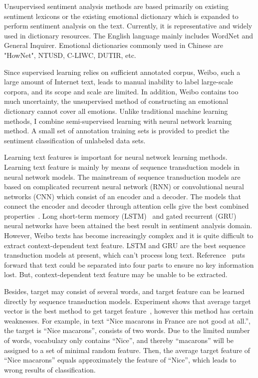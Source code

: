 \documentclass[runningheads, twocolumn]{llncs}
\begin{document}
Unsupervised sentiment analysis methods are based primarily on existing sentiment lexicons or the existing emotional dictionary which is expanded to perform sentiment analysis on the text. Currently, it is representative and widely used in dictionary resources. The English language mainly includes WordNet and General Inquirer. Emotional dictionaries commonly used in Chinese are "HowNet", NTUSD, C-LIWC, DUTIR, etc.

Since supervised learning relies on sufficient annotated corpus, Weibo, such a large amount of Internet text, leads to manual inability to label large-scale corpora, and its scope and scale are limited. In addition, Weibo contains too much uncertainty, the unsupervised method of constructing an emotional dictionary cannot cover all emotions.  Unlike traditional machine learning methods, I combine semi-supervised learning with neural network learning method. A small set of annotation training sets is provided to predict the sentiment classification of unlabeled data sets.

Learning text features is important for neural network learning methods. Learning text feature is mainly by means of sequence transduction models in neural network models. The mainstream of sequence transduction models are based on complicated recurrent neural network (RNN) or convolutional neural networks (CNN) which consist of an encoder and a decoder. The models that connect the encoder and decoder through attention cells give the best combined properties~\cite{DBLP:conf/nips/VaswaniSPUJGKP17}. Long short-term memory (LSTM)~\cite{DBLP:journals/neco/HochreiterS97} and gated recurrent (GRU)~\cite{DBLP:journals/corr/ChungGCB14} neural networks have been attained the best result in sentiment analysis domain. However, Weibo texts has become increasingly complex and it is quite difficult to extract context-dependent text feature. LSTM and GRU are the best sequence transduction models at present, which can’t process long text. Reference~\cite{DBLP:conf/naacl/SongSLZ18} puts forward that text could be separated into four parts to ensure no key information lost. But, context-dependent text feature may be unable to be extracted.

Besides, target may consist of several words, and target feature can be learned directly by sequence transduction models. Experiment shows that average target vector is the best method to get target feature~\cite{DBLP:journals/eswa/DoPMA19}, however this method has certain weaknesses. For example, in text “Nice macarons in France are not good at all.”, the target is “Nice macarons”, consists of two words. Due to the limited number of words, vocabulary only contains “Nice”, and thereby “macarons” will be assigned to a set of minimal random feature. Then, the average target feature of “Nice macarons” equals approximately the feature of “Nice”, which leads to wrong results of classification.
\end{document}
